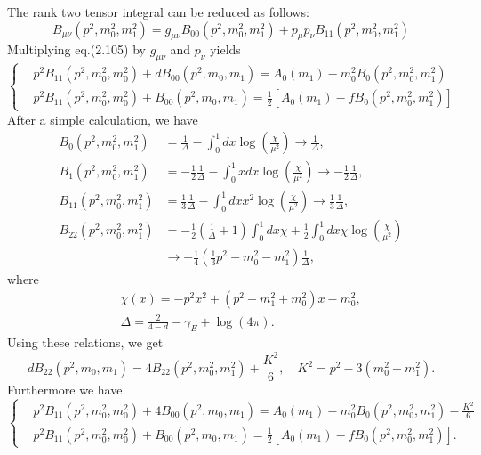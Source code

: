 The rank two tensor integral can be reduced as follows:
\begin{equation}
B_{\mu\nu}(p^2,m_0^2,m_1^2)=g_{\mu\nu}B_{00}(p^2,m_0^2,m_1^2)+p_{\mu}p_\nu B_{11}(p^2,m_0^2,m_1^2)
\end{equation}
Multiplying eq.(2.105) by $g_{\mu\nu}$ and $p_\nu$ yields
\begin{equation}
\begin{cases}
&p^2B_{11}(p^2,m_0^2,m_0^2)+dB_{00}(p^2,m_0,m_1)=A_0(m_1)-m_0^2B_0(p^2,m_0^2,m_1^2)\\
&p^2B_{11}(p^2,m_0^2,m_0^2)+B_{00}(p^2,m_0,m_1)=\frac{1}{2}[A_0(m_1)-fB_0(p^2,m_0^2,m_1^2)]
\end{cases}
\end{equation}
After a simple calculation, we have
\begin{align}
B_0(p^2,m_0^2,m_1^2)&=\frac{1}{\Delta}-\int_{0}^{1}dx\log\left(\frac{\chi}{\mu^2}\right)\to \frac{1}{\Delta},\nonumber\\
B_1(p^2,m_0^2,m_1^2)&=-\frac{1}{2}\frac{1}{\Delta}-\int_{0}^{1}xdx\log\left(\frac{\chi}{\mu^2}\right)\to -\frac{1}{2}\frac{1}{\Delta},\nonumber\\
B_{11}(p^2,m_0^2,m_1^2)&=\frac{1}{3}\frac{1}{\Delta}-\int_{0}^{1}dxx^2\log\left(\frac{\chi}{\mu^2}\right)\to \frac{1}{3}\frac{1}{\Delta},\nonumber\\
B_{22}(p^2,m_0^2,m_1^2)&=-\frac{1}{2}\left(\frac{1}{\Delta}+1\right)\int_{0}^{1}dx\chi+\frac{1}{2}\int_{0}^{1}dx\chi\log\left(\frac{\chi}{\mu^2}\right)\nonumber\\
&\to -\frac{1}{4}\left(\frac{1}{3}p^2-m_0^2-m_1^2\right)\frac{1}{\Delta},
\end{align}
where
\begin{eqnarray}
&&\chi(x)=-p^2x^2+(p^2-m_1^2+m_0^2)x-m_0^2,\nonumber\\
&&\Delta=\frac{2}{4-d}-\gamma_E+\log(4\pi).
\end{eqnarray}
Using these relations, we get 
\begin{equation}
dB_{22}(p^2,m_0,m_1)=4B_{22}(p^2,m_0^2,m_1^2)+\frac{K^2}{6},\quad K^2=p^2-3(m_0^2+m_1^2).
\end{equation}
Furthermore we have
\begin{equation}
\begin{cases}
&p^2B_{11}(p^2,m_0^2,m_0^2)+4B_{00}(p^2,m_0,m_1)=A_0(m_1)-m_0^2B_0(p^2,m_0^2,m_1^2)-\frac{K^2}{6}\\
&p^2B_{11}(p^2,m_0^2,m_0^2)+B_{00}(p^2,m_0,m_1)=\frac{1}{2}[A_0(m_1)-fB_0(p^2,m_0^2,m_1^2)].
\end{cases}
\end{equation}
